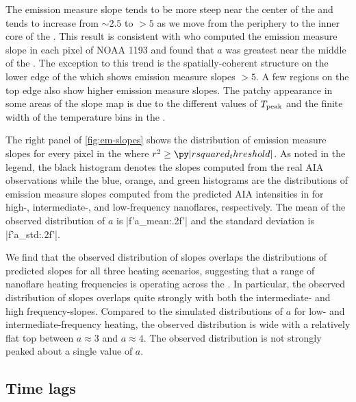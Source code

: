 The emission measure slope tends to be more steep near the center of the \AR{} and tends to increase from $\sim2.5$ to $>5$ as we move from the periphery to the inner core of the \AR{}. This result is consistent with \citet{del_zanna_evolution_2015} who computed the emission measure slope in each pixel of \AR{} NOAA 1193 and found that $a$ was greatest near the middle of the \AR{}. The exception to this trend is the spatially-coherent structure on the lower edge of the \AR{} which shows emission measure slopes $>5$. A few regions on the top edge also show higher emission measure slopes. The patchy appearance in some areas of the slope map is due to the different values of $T_\textup{peak}$ and the finite width of the temperature bins in the \dem.

The right panel of \autoref{fig:em-slopes} shows the distribution of emission measure slopes for every pixel in the \AR{} where $r^2\ge\py|rsquared_threshold|$. As noted in the legend, the black histogram denotes the slopes computed from the real AIA observations while the blue, orange, and green histograms are the distributions of emission measure slopes computed from the predicted AIA intensities in  for high-, intermediate-, and low-frequency nanoflares, respectively. The mean of the observed distribution of $a$ is \py[manager_em]|f'{a_mean:.2f}'| and the standard deviation is \py[manager_em]|f'{a_std:.2f}'|. 

We find that the observed distribution of slopes overlaps the distributions of predicted slopes for all three heating scenarios, suggesting that a range of nanoflare heating frequencies is operating across the \AR. In particular, the observed distribution of slopes overlaps quite strongly with both the intermediate- and high frequency-slopes. Compared to the simulated distributions of $a$ for low- and intermediate-frequency heating, the observed distribution is wide with a relatively flat top between $a\approx3$ and $a\approx4$. The observed distribution is not strongly peaked about a single value of $a$. 

\subsection{Time lags}\label{sec:timelags}

